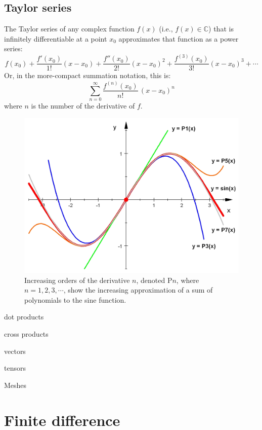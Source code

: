 \documentclass[a4paper,10pt]{scrartcl}
\begin{document}
\subsection{Taylor series}

The Taylor series of any complex function $f(x)$ (i.e., $f(x) \in \mathbb{C}$) that is infinitely differentiable at a point $x_0$ approximates that function as a power series:
\begin{equation}
f(x_0)+\frac {f'(x_0)}{1!} (x-x_0)+ \frac{f''(x_0)}{2!} (x-x_0)^2+\frac{f^{(3)}(x_0)}{3!}(x-x_0)^3+ \cdots
\end{equation}
Or, in the more-compact summation notation, this is:
\begin{equation}
\sum_{n=0} ^ {\infty} \frac {f^{(n)}(x_0)}{n!} \, (x-x_0)^{n}
\end{equation}
where $n$ is the number of the derivative of $f$.

\begin{figure}[!ht]
\begin{center}
\includegraphics[width=.8\linewidth]{figures/NumericalAndMath/Taylor_Approximation_of_sin(x).jpeg}
\end{center}
\caption{Increasing orders of the derivative $n$, denoted P$n$, where $n = 1, 2, 3, \cdots$, show the increasing approximation of a sum of polynomials to the sine function.}
\end{figure}



dot products

cross products

vectors

tensors


Meshes

\section{Finite difference}
\end{document}
